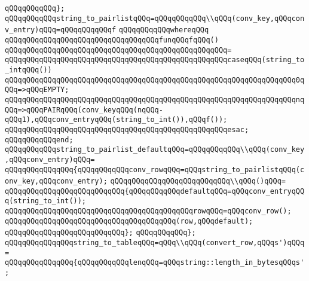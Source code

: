 \verb|qQQqqQQqqQQq};|\newline
\newline
\verb|qQQqqQQqqQQqstring_to_pairlistqQQq=qQQqqQQqqQQq\\qQQq(conv_key,qQQqconv_entry)qQQq=qQQqqQQqqQQqf|\newline
\verb|qQQqqQQqqQQqwhereqQQq|\newline
\verb|qQQqqQQqqQQqqQQqqQQqqQQqqQQqqQQqqQQqfunqQQqfqQQq()|\newline
\verb|qQQqqQQqqQQqqQQqqQQqqQQqqQQqqQQqqQQqqQQqqQQqqQQqqQQq=|\newline
\verb|qQQqqQQqqQQqqQQqqQQqqQQqqQQqqQQqqQQqqQQqqQQqqQQqqQQqcaseqQQq(string_to_intqQQq())|\newline
\verb|qQQqqQQqqQQqqQQqqQQqqQQqqQQqqQQqqQQqqQQqqQQqqQQqqQQqqQQqqQQqqQQqqQQq0qQQq=>qQQqEMPTY;|\newline
\verb|qQQqqQQqqQQqqQQqqQQqqQQqqQQqqQQqqQQqqQQqqQQqqQQqqQQqqQQqqQQqqQQqqQQqnqQQq=>qQQqPAIRqQQq(conv_keyqQQq(nqQQq-qQQq1),qQQqconv_entryqQQq(string_to_int()),qQQqf());|\newline
\verb|qQQqqQQqqQQqqQQqqQQqqQQqqQQqqQQqqQQqqQQqqQQqqQQqqQQqesac;|\newline
\verb|qQQqqQQqqQQqend;|\newline
\newline
\verb|qQQqqQQqqQQqstring_to_pairlist_defaultqQQq=qQQqqQQqqQQq\\qQQq(conv_key,qQQqconv_entry)qQQq=|\newline
\verb|qQQqqQQqqQQqqQQq{qQQqqQQqqQQqconv_rowqQQq=qQQqstring_to_pairlistqQQq(conv_key,qQQqconv_entry);|\newline
\verb|qQQqqQQqqQQqqQQqqQQqqQQqqQQq\\qQQq()qQQq=|\newline
\verb|qQQqqQQqqQQqqQQqqQQqqQQqqQQq{qQQqqQQqqQQqdefaultqQQq=qQQqconv_entryqQQq(string_to_int());|\newline
\verb|qQQqqQQqqQQqqQQqqQQqqQQqqQQqqQQqqQQqqQQqqQQqrowqQQq=qQQqconv_row();|\newline
\verb|qQQqqQQqqQQqqQQqqQQqqQQqqQQqqQQqqQQqqQQq(row,qQQqdefault);|\newline
\verb|qQQqqQQqqQQqqQQqqQQqqQQqqQQq};|\newline
\verb|qQQqqQQqqQQq};|\newline
\newline
\verb|qQQqqQQqqQQqqQQqstring_to_tableqQQq=qQQq\\qQQq(convert_row,qQQqs')qQQq=|\newline
\verb|qQQqqQQqqQQqqQQq{qQQqqQQqqQQqlenqQQq=qQQqstring::length_in_bytesqQQqs';|\newline
